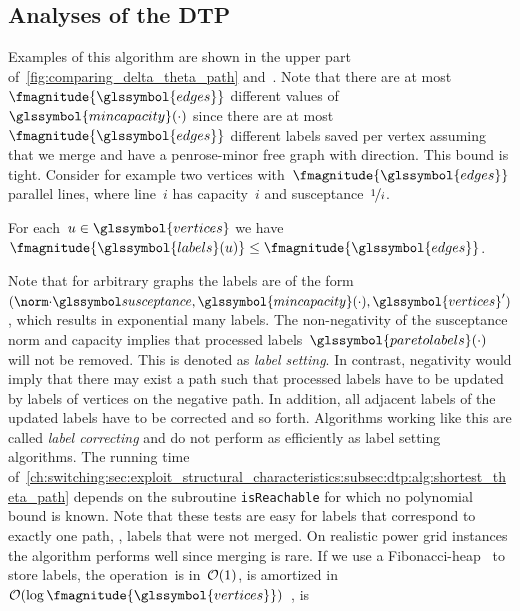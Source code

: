 \subsection{Analyses of the DTP}
\label{ch:switching:sec:exploit_structural_characteristics:subsec:dtp_analyses}
% 
Examples of this algorithm are shown 
% 
in the upper part of~\cref{fig:comparing_delta_theta_path}
and~. Note that there are at most~$\fmagnitude{\glssymbol{edges}}$
different values of~$\glssymbol{mincapacity}(\cdot)$
since there are at most~$\fmagnitude{\glssymbol{edges}}$ different labels saved per vertex
assuming that we merge and have a penrose-minor free graph with direction. This
bound is tight. Consider for example two vertices with~$\fmagnitude{\glssymbol{edges}}$
parallel lines, where line~$i$ has capacity~$i$ and
susceptance~$\nicefrac{1}{i}$.
%
\begin{lemma}
  For each~$\vertexa\in\glssymbol{vertices}$ we have~$\fmagnitude{
    \glssymbol{labels}(\vertexa)}\le\fmagnitude{\glssymbol{edges}}$.
  \label{ch:switching:sec:exploit_structural_characteristics:lem:label_set_bound}
\end{lemma}
%
Note that for arbitrary graphs the labels are of the form~$(\bnorm{\cdot},
\glssymbol{mincapacity}(\cdot),\glssymbol{vertices}')$, which results in
exponential many
labels. The non-negativity of the susceptance norm and capacity implies that
processed labels~$\glssymbol{paretolabels}(\cdot)$ will not be removed. This is
denoted as \emph{label setting}. In contrast, negativity would imply that there
may exist a path such that processed labels have to be updated by labels of
vertices on the negative path. In addition, all adjacent labels of the updated
labels have to be corrected and so forth. Algorithms working like this are
called \emph{label correcting} and do not perform as efficiently as label
setting algorithms.
% 
The running time
of~\cref{ch:switching:sec:exploit_structural_characteristics:subsec:dtp:alg:shortest_theta_path}
depends on the subroutine \texttt{isReachable} for which no polynomial bound is
known. Note that these tests are easy for labels that correspond to exactly one
path, \ie, labels that were not merged. On realistic power grid instances the
algorithm performs well since merging is rare.
% 
If we use a Fibonacci-heap~ to store labels, the
operation~\myinsert is in~$\mathcal{O}(1)$, \deleteMin is amortized in~$\bigO(\log
\fmagnitude{\glssymbol{vertices}})$~\parencite{715934}, \deleteDominatedLabels is
